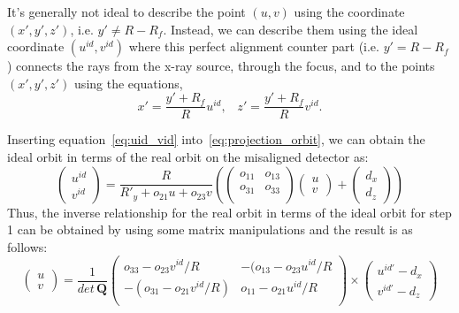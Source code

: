 It's generally not ideal to describe the point $(u, v)$ using the coordinate $(x', y', z')$, i.e. $y' \neq R - R_f$.  Instead, we can describe them using the ideal coordinate $(u^{id}, v^{id})$ where this perfect alignment counter part (i.e. $y' = R - R_f$) connects the rays from the x-ray source, through the focus, and to the points $(x', y', z')$ using the equations,
\begin{equation}
x' = \frac{y' + R_f}{R} u^{id}, \; \; \; z' = \frac{y' + R_f}{R} v^{id}.
\label{eq:uid_vid}
\end{equation}

\noindent Inserting equation~\ref{eq:uid_vid} into~\ref{eq:projection_orbit}, we can obtain the ideal orbit in terms of the real orbit on the misaligned detector as:
\begin{equation}
\begin{pmatrix}
u^{id} \\
v^{id} 
\end{pmatrix} = \frac{R}{R'_y + o_{21}u + o_{23} v} 
\left(
\begin{pmatrix}
o_{11} & o_{13} \\
o_{31} & o_{33} \\
\end{pmatrix} 
\begin{pmatrix}
u \\
v
\end{pmatrix} + 
\begin{pmatrix}
d_x \\
d_z
\end{pmatrix}
\right)
\label{eq:ideal_orbit_matrix}
\end{equation}
\noindent Thus, the inverse relationship for the real orbit in terms of the ideal orbit for step 1 can be obtained by using some matrix manipulations and the result is as follows:
\begin{equation}
\begin{pmatrix}
u \\
v
\end{pmatrix} = \frac{1}{det \, \mathrm{\mathbf{Q}}}
\begin{pmatrix}
o_{33} - o_{23} v^{id}/R & -(o_{13} - o_{23} u^{id}/R \\
-(o_{31} - o_{21} v^{id}/R) & o_{11} - o_{21} u^{id}/R \\
\end{pmatrix}
\times 
\begin{pmatrix}
u^{id'} - d_x \\
v^{id'} - d_z
\end{pmatrix}
\label{eq:misaligned_orbit_matrix}
\end{equation}
